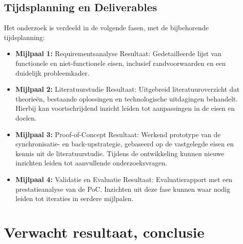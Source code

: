 \subsection{Tijdsplanning en Deliverables}
Het onderzoek is verdeeld in de volgende fasen, met de bijbehorende tijdsplanning:
\begin{itemize}
    \item \textbf{Mijlpaal 1:} Requirementsanalyse
    Resultaat: Gedetailleerde lijst van functionele en niet-functionele eisen, inclusief randvoorwaarden en een duidelijk probleemkader.
    
    \item \textbf{Mijlpaal 2:} Literatuurstudie 
    Resultaat: Uitgebreid literatuuroverzicht dat theorieën, bestaande oplossingen en technologische uitdagingen behandelt. Hierbij kan voortschrijdend inzicht leiden tot aanpassingen in de eisen en doelen.  
    
    \item \textbf{Mijlpaal 3:} Proof-of-Concept  
    Resultaat: Werkend prototype van de synchronisatie- en back-upstrategie, gebaseerd op de vastgelegde eisen en kennis uit de literatuurstudie. Tijdens de ontwikkeling kunnen nieuwe inzichten leiden tot aanvullende onderzoeksvragen.  
    
    \item \textbf{Mijlpaal 4:} Validatie en Evaluatie  
    Resultaat: Evaluatierapport met een prestatieanalyse van de PoC. Inzichten uit deze fase kunnen waar nodig leiden tot iteraties in eerdere mijlpalen. 
\end{itemize}


\section{Verwacht resultaat, conclusie}%
\label{sec:verwachte_resultaten}




